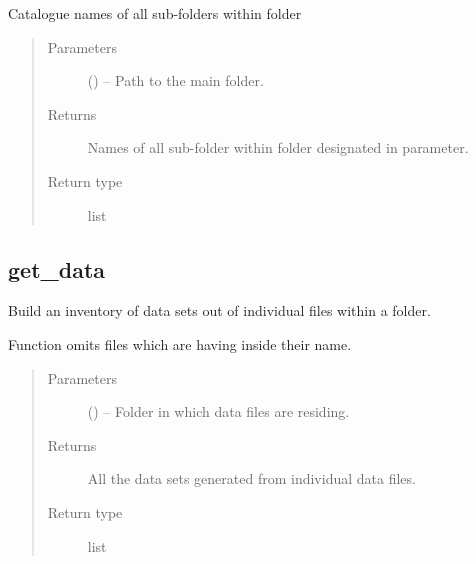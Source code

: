\documentclass[a4paper,10pt,english]{sphinxmanual}
\begin{document}
\begin{fulllineitems}
\label{\detokenize{api/ucf.get_all_sub_folders_within_folder:ucf.get_all_sub_folders_within_folder}}
Catalogue names of all sub-folders within folder
\begin{quote}\begin{description}
\item[{Parameters}] \leavevmode
{} () -- Path to the main folder.

\item[{Returns}] \leavevmode
Names of all sub-folder within folder designated in  parameter.

\item[{Return type}] \leavevmode
list

\end{description}\end{quote}

\end{fulllineitems}



\subsection{get\_data}
\label{\detokenize{api/ucf.get_data:get-data}}\label{\detokenize{api/ucf.get_data::doc}}

\begin{fulllineitems}
\label{\detokenize{api/ucf.get_data:ucf.get_data}}
Build an inventory of data sets out of individual files within a
folder.

Function omits files which are having  inside their name.
\begin{quote}\begin{description}
\item[{Parameters}] \leavevmode
{} () -- Folder in which data files are residing.

\item[{Returns}] \leavevmode
All the data sets generated from individual data
files.

\item[{Return type}] \leavevmode
list

\end{description}\end{quote}

\end{fulllineitems}
\end{document}
